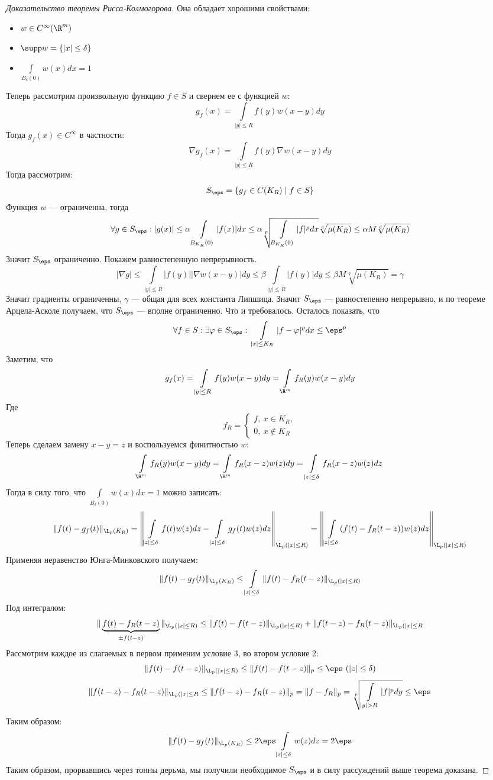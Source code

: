 \begin{proof}[Доказательство теоремы Рисса-Колмогорова]
	Она обладает хорошими свойствами: 
	\begin{itemize}
		\item $ w \in C^\infty(\R^m)$
		\item $\supp w = \{|x| \leq \delta\}$
		\item $\int\limits_{B_{\delta}(0)} w(x) dx = 1$
	\end{itemize}
	Теперь рассмотрим произвольную функцию $f \in S$ и свернем ее с функцией $w$:
	$$
	g_f(x) = \int\limits_{|y| \leq R} f(y)w(x-y)dy
	$$
	Тогда $g_f(x) \in C^\infty$ в частности:
	$$
	\nabla g_f(x) = \int\limits_{|y| \leq R} f(y) \nabla w (x-y) dy 
	$$ 
	Тогда рассмотрим:
	$$
	S_\eps = \{g_f \in C(K_R) \mid f \in S\}
	$$
	Функция $w$ ---  ограниченна, тогда
	$$
	\forall g \in S_\eps: |g(x)| \leq \alpha \int\limits_{B_{K_R}(0)} |f(x)|dx \leq \alpha \sqrt[p]{\int\limits_{B_{K_R}(0)}|f|^pdx} \sqrt[q]{\mu(K_R)} \leq \alpha M \sqrt[q]{\mu(K_R)}
	$$
	Значит $S_\eps$ ограниченно. Покажем равностепенную непрерывность. 
	$$
	|\nabla g| \leq \int\limits_{|y| \leq R} |f(y)| |\nabla w (x-y)| dy \leq \beta \int\limits_{|y| \leq R} |f(y)| dy \leq \beta M \sqrt[q]{\mu(K_R)} = \gamma
	$$
	Значит градиенты ограниченны, $\gamma$ --- общая для всех константа Липшица. Значит $S_\eps$ --- равностепенно непрерывно, и по теореме Арцела-Асколе получаем, что $S_\eps$ --- вполне ограниченно. Что и требовалось. Осталось показать, что 
	$$
	\forall f \in S: \exists \varphi \in S_\eps: \ \int\limits_{|x| \leq K_R} |f - \varphi|^p dx \leq \eps^p
	$$
	Заметим, что 
	$$
	g_f(x) = \int\limits_{|y| \leq R}f(y)w(x-y)dy = \int\limits_{\R^m}f_R(y)w(x-y)dy
	$$
	Где
	$$
	f_R = \begin{cases}
		f, \ x \in K_R, \\
		0, \ x \notin K_R
	\end{cases}
	$$
	Теперь сделаем замену $x - y = z$ и воспользуемся финитностью $w$:
	$$
	\int\limits_{\R^m}f_R(y)w(x-y)dy = \int\limits_{\R^m}f_R(x-z)w(z)dy = \int\limits_{|z| \leq \delta}f_R(x-z)w(z)dz 
	$$
	Тогда в силу того, что $\int\limits_{B_{\delta}(0)} w(x) dx = 1$ можно записать:
	$$
	\|f(t) - g_f(t)\|_{\L_p(K_R)} = \left\|\int\limits_{|z| \leq \delta} f(t)w(z)dz - \int\limits_{|z| \leq \delta} g_f(t) w(z) dz\right\|_{\L_p(|x|\leq R)}  = \left\| \int\limits_{|z| \leq \delta} (f(t) - f_R(t-z))w(z)dz\right\|_{\L_p(|x| \leq R)}
	$$
	Применяя неравенство Юнга-Минковского получаем:
	$$
	\|f(t) - g_f(t)\|_{\L_p(K_R)}  \leq \int\limits_{|z| \leq \delta} \|f(t) - f_R(t -z)\|_{\L_p(|x| \leq R)} 
	$$
	Под интегралом:
	$$
	\|\underbrace{f(t) - f_R(t -z)}_{\pm f(t-z)}\|_{\L_p(|x| \leq R)} \leq \|f(t)-f(t-z)\|_{\L_p(|x| \leq R)} + \|f(t-z) - f_R(t-z)\|_{\L_p(|x| \leq R}
	$$
	Рассмотрим каждое из слагаемых в первом применим условие 3, во втором условие 2: 
	$$
	\|f(t)-f(t-z)\|_{\L_p(|x| \leq R)} \leq \|f(t)-f(t-z)\|_p \leq \eps \ (|z| \leq \delta)
	$$
	$$
	 \|f(t-z) - f_R(t-z)\|_{\L_p(|x| \leq R} \leq \|f(t-z) - f_R(t-z)\|_p  = \|f - f_R\|_p = \sqrt[p]{\int\limits_{|y| > R} |f|^pdy} \leq \eps 
	$$
	Таким образом:
	$$
	\|f(t) - g_f(t)\|_{\L_p(K_R)} \leq 2\eps \int\limits_{|z|\leq \delta} w(z)dz  = 2\eps
	$$
	Таким образом, прорвавшись через тонны дерьма, мы получили необходимое $S_\eps$ и в силу рассуждений выше теорема доказана.
\end{proof}
